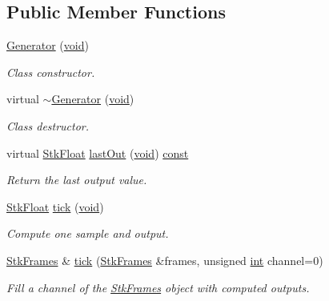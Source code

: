 \subsection*{Public Member Functions}
\begin{DoxyCompactItemize}
\item 
\hyperlink{class_nyq_1_1_generator_a35e61989f22dfc623b2237ece2436dd4}{Generator} (\hyperlink{sound_8c_ae35f5844602719cf66324f4de2a658b3}{void})
\begin{DoxyCompactList}\small\item\em Class constructor. \end{DoxyCompactList}\item 
virtual \hyperlink{class_nyq_1_1_generator_ac4e898bd493cbaef32469eddd29f5f59}{$\sim$\+Generator} (\hyperlink{sound_8c_ae35f5844602719cf66324f4de2a658b3}{void})
\begin{DoxyCompactList}\small\item\em Class destructor. \end{DoxyCompactList}\item 
virtual \hyperlink{namespace_nyq_a044fa20a706520a617bbbf458a7db7e4}{Stk\+Float} \hyperlink{class_nyq_1_1_generator_a9b5762c781de19194b47827374fdf297}{last\+Out} (\hyperlink{sound_8c_ae35f5844602719cf66324f4de2a658b3}{void}) \hyperlink{getopt1_8c_a2c212835823e3c54a8ab6d95c652660e}{const} 
\begin{DoxyCompactList}\small\item\em Return the last output value. \end{DoxyCompactList}\item 
\hyperlink{namespace_nyq_a044fa20a706520a617bbbf458a7db7e4}{Stk\+Float} \hyperlink{class_nyq_1_1_generator_a45a10d993eb07f35506250f2cd182786}{tick} (\hyperlink{sound_8c_ae35f5844602719cf66324f4de2a658b3}{void})
\begin{DoxyCompactList}\small\item\em Compute one sample and output. \end{DoxyCompactList}\item 
\hyperlink{class_nyq_1_1_stk_frames}{Stk\+Frames} \& \hyperlink{class_nyq_1_1_generator_af263963ee6578397426ba28100bca965}{tick} (\hyperlink{class_nyq_1_1_stk_frames}{Stk\+Frames} \&frames, unsigned \hyperlink{xmltok_8h_a5a0d4a5641ce434f1d23533f2b2e6653}{int} channel=0)
\begin{DoxyCompactList}\small\item\em Fill a channel of the \hyperlink{class_nyq_1_1_stk_frames}{Stk\+Frames} object with computed outputs. \end{DoxyCompactList}\end{DoxyCompactItemize}
